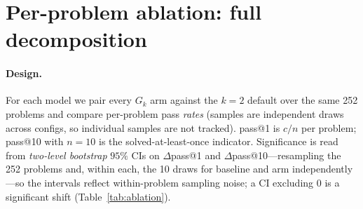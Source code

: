 \documentclass[11pt]{article}                       %
\begin{document}



\appendix
\section{Per-problem ablation: full decomposition}\label{app:ablation}
\paragraph{Design.} For each model we pair every $G_k$ arm against the $k{=}2$ default over the same
252 problems and compare per-problem pass \emph{rates} (samples are independent draws across configs,
so individual samples are not tracked). pass@1 is $c/n$ per problem; pass@10 with $n{=}10$ is the
solved-at-least-once indicator. Significance is read from \emph{two-level bootstrap} $95\%$ CIs on
$\Delta$pass@1 and $\Delta$pass@10---resampling the 252 problems and, within each, the 10 draws for
baseline and arm independently---so the intervals reflect within-problem sampling noise; a CI excluding
0 is a significant shift (Table~\ref{tab:ablation}).
\end{document}
